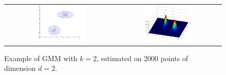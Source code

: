 \documentclass[a4paper,10pt]{article}
\begin{document}
 
\begin{figure}[htb]
	\smallskip
	\centering
	\begin{tabular}{cc}
		\includegraphics[width=0.50\textwidth]{ourGmmK2.png} &
		\includegraphics[width=0.50\textwidth]{ourGmmK2-ezsurf.png} \\
	\end{tabular}
	\caption{\label{fig:gmmd2k2}
		Example of GMM with $k=2$, estimated on 2000 points of dimension $d=2$.  }
\end{figure}




\end{document}

